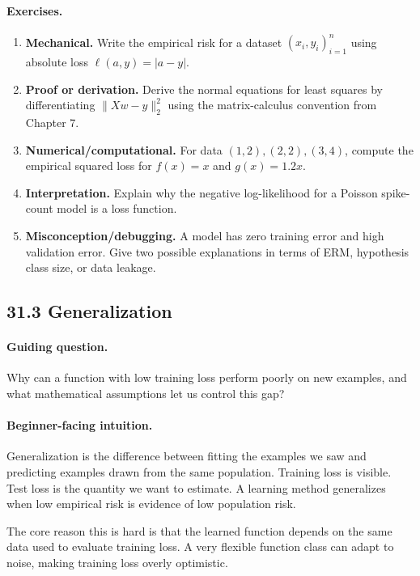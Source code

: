 \paragraph{Exercises.}
\begin{enumerate}[label=\textbf{31.2.\arabic*.}, leftmargin=*]
\item \textbf{Mechanical.} Write the empirical risk for a dataset \((x_i,y_i)_{i=1}^n\) using absolute loss \(\ell(a,y)=|a-y|\).
\item \textbf{Proof or derivation.} Derive the normal equations for least squares by differentiating \(\|Xw-y\|_2^2\) using the matrix-calculus convention from Chapter 7.
\item \textbf{Numerical/computational.} For data \((1,2),(2,2),(3,4)\), compute the empirical squared loss for \(f(x)=x\) and \(g(x)=1.2x\).
\item \textbf{Interpretation.} Explain why the negative log-likelihood for a Poisson spike-count model is a loss function.
\item \textbf{Misconception/debugging.} A model has zero training error and high validation error. Give two possible explanations in terms of ERM, hypothesis class size, or data leakage.
\end{enumerate}

\subsection{31.3 Generalization}

\paragraph{Guiding question.}
Why can a function with low training loss perform poorly on new examples, and what mathematical assumptions let us control this gap?

\paragraph{Beginner-facing intuition.}
Generalization is the difference between fitting the examples we saw and predicting examples drawn from the same population. Training loss is visible. Test loss is the quantity we want to estimate. A learning method generalizes when low empirical risk is evidence of low population risk.

The core reason this is hard is that the learned function depends on the same data used to evaluate training loss. A very flexible function class can adapt to noise, making training loss overly optimistic.

